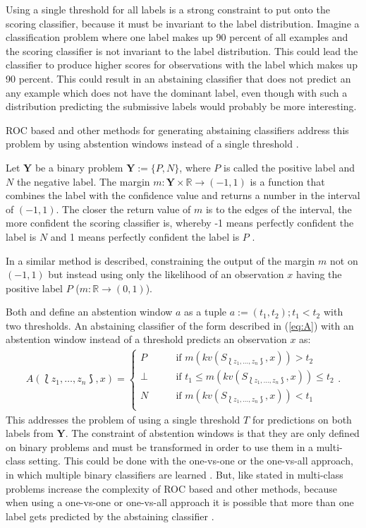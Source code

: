 \documentclass[twoside,11pt]{article}
\def\ds{\Lbag z_1,\dots,z_n \Rbag}
\def\Y{\textbf{Y}}
\begin{document}
Using a single threshold for all labels is a strong
constraint to put onto the scoring classifier, because it
must be invariant to the label distribution.
Imagine a classification problem where one label makes up
90 percent of all examples and the scoring classifier is
not invariant to the label distribution.
This could lead the classifier to produce higher scores for
observations with the label which makes up 90 percent.
This could result in an abstaining classifier that does not
predict an any example which does not have the dominant
label, even though with such a distribution predicting
the submissive labels would probably be more interesting.

ROC based and other methods for generating abstaining
classifiers address this problem by using abstention
windows instead of a single threshold
\citep[see][]{friedel_et_al_2006}.

Let $\Y$ be a binary problem $\Y := \{P, N\}$,
where $P$ is called the positive label and $N$ the
negative label.
The margin $m: \Y \times \mathbb{R} \rightarrow (-1,1)$ is
a function that combines the label with the confidence
value and returns a number in the interval of $(-1,1)$.
The closer the return value of $m$ is to the edges of the
interval, the more confident the scoring classifier is,
whereby -1 means perfectly confident the label is $N$ and 1
means perfectly confident the label is $P$
\citep[see][]{friedel_et_al_2006}.

In \citet{guan_et_al_2018} a similar method is described,
constraining the output of the margin $m$ not on $(-1,1)$
but instead using only the likelihood of an observation $x$
having the positive label $P$
($m: \mathbb{R} \rightarrow (0,1)$).

Both \citet{friedel_et_al_2006} and \citet{guan_et_al_2018}
define an abstention window $a$ as a tuple
$a := (t_1, t_2); t_1 < t_2$ with two thresholds.
An abstaining classifier of the form described in
(\ref{eq:A}) with an abstention window instead of a
threshold predicts an observation $x$ as:
\begin{align*}
  A(\ds, x) =
    \begin{cases}
      P    &\qquad \text{if } m(kv(S_{\ds}, x)) > t_2 \\
      \bot &\qquad \text{if }
            t_1 \leq m(kv(S_{\ds}, x)) \leq t_2 \\
      N    &\qquad \text{if } m(kv(S_{\ds}, x)) < t_1 \\
    \end{cases}.
\end{align*}
This addresses the problem of using a single threshold $T$
for predictions on both labels from $\Y$.
The constraint of abstention windows is that they are only
defined on binary problems and must be transformed in order
to use them in a multi-class setting.
This could be done with the one-vs-one or the one-vs-all
approach, in which multiple binary classifiers are learned
\citep[see e.g.][Chapter 14.5]{murphy_2012}.
But, like stated in \citet{friedel_2005} multi-class
problems increase the complexity of ROC based and other
methods, because when using a one-vs-one or one-vs-all
approach it is possible that more than one label gets
predicted by the abstaining classifier
\citep[see][]{friedel_2005}.
\end{document}
